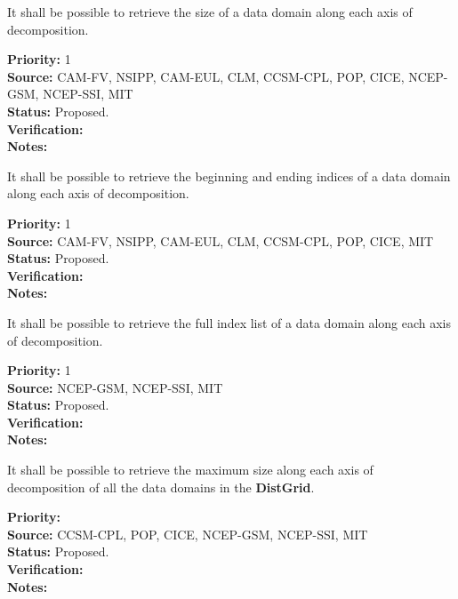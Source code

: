 

It shall be possible to retrieve the size of a data domain
along each axis of decomposition.

\begin{reqlist}
{\bf Priority:} 1 \\ 
{\bf Source:} CAM-FV, NSIPP, CAM-EUL, CLM, CCSM-CPL, POP, CICE, NCEP-GSM, NCEP-SSI, MIT \\
{\bf Status:} Proposed. \\
{\bf Verification:} \\
{\bf Notes:}
\end{reqlist}


It shall be possible to retrieve the beginning and ending indices of a
data domain along each axis of decomposition.

\begin{reqlist}
{\bf Priority:} 1 \\
{\bf Source:} CAM-FV, NSIPP, CAM-EUL, CLM, CCSM-CPL, POP, CICE, MIT \\
{\bf Status:} Proposed. \\
{\bf Verification:} \\
{\bf Notes:}
\end{reqlist}


It shall be possible to retrieve the full index list of a
data domain along each axis of decomposition.

\begin{reqlist}
{\bf Priority:} 1 \\ 
{\bf Source:} NCEP-GSM, NCEP-SSI, MIT \\
{\bf Status:} Proposed. \\
{\bf Verification:} \\
{\bf Notes:}
\end{reqlist}


It shall be possible to retrieve the maximum size along each axis of
decomposition of all the data domains in the \textbf{DistGrid}. 

\begin{reqlist}
{\bf Priority:} \\
{\bf Source:} CCSM-CPL, POP, CICE, NCEP-GSM, NCEP-SSI, MIT \\
{\bf Status:} Proposed. \\
{\bf Verification:} \\
{\bf Notes:}
\end{reqlist}

